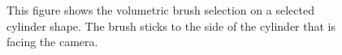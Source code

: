 \begin{figure}
\centering
{}
\caption[Example of an improved volumetric brush selection on a cylinder]
{This figure shows the volumetric brush selection on a selected cylinder shape. The brush sticks to the side of the cylinder that is facing the camera.}
\label{fig:synthetic_scene_brush}
\end{figure}